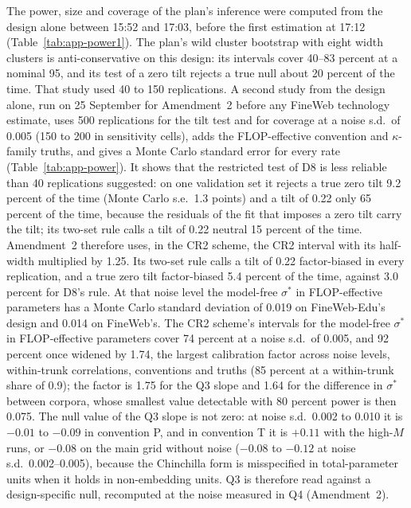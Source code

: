 The power, size and coverage of the plan's inference were computed from the design alone between 15:52 and 17:03, before
the first estimation at 17:12 (Table~\ref{tab:app-power1}). The plan's wild cluster bootstrap with eight width clusters
is anti-conservative on this design: its intervals cover 40--83 percent at a nominal 95, and its test of a zero tilt
rejects a true null about 20 percent of the time. That study used 40 to 150 replications. A second study from the design
alone, run on 25 September for Amendment~2 before any FineWeb technology estimate, uses 500 replications for the tilt test
and for coverage at a noise s.d.\ of 0.005 (150 to 200 in sensitivity cells), adds the FLOP-effective convention and
$\kappa$-family truths, and gives a Monte Carlo standard error for every rate (Table~\ref{tab:app-power}). It shows that
the restricted test of D8 is less reliable than 40 replications suggested: on one validation set it rejects a true zero
tilt 9.2 percent of the time (Monte Carlo s.e.\ 1.3 points) and a tilt of 0.22 only 65 percent of the time, because the
residuals of the fit that imposes a zero tilt carry the tilt; its two-set rule calls a tilt of 0.22 neutral 15 percent
of the time. Amendment~2 therefore uses, in the CR2 scheme, the CR2 interval with its half-width multiplied by 1.25. Its
two-set rule calls a tilt of 0.22 factor-biased in every replication, and a true zero tilt factor-biased 5.4 percent of
the time, against 3.0 percent for D8's rule. At that noise level the model-free $\sigma^*$ in FLOP-effective parameters has a
Monte Carlo standard deviation of 0.019 on FineWeb-Edu's design and 0.014 on FineWeb's. The CR2 scheme's intervals for
the model-free $\sigma^*$ in FLOP-effective parameters cover 74 percent at a noise
s.d.\ of 0.005, and 92 percent once widened by 1.74, the largest calibration factor across noise levels, within-trunk
correlations, conventions and truths (85 percent at a within-trunk share of 0.9); the factor is 1.75 for the Q3 slope and 1.64 for the difference in $\sigma^*$
between corpora, whose smallest value detectable with 80 percent power is then 0.075. The null value of the Q3 slope is
not zero: at noise s.d.\ 0.002 to 0.010 it is $-0.01$ to $-0.09$ in convention P, and in convention T it is $+0.11$ with
the high-$M$ runs, or $-0.08$ on the main grid without noise ($-0.08$ to $-0.12$ at noise s.d.\ 0.002--0.005), because
the Chinchilla form is misspecified in total-parameter units when it holds in non-embedding units. Q3 is therefore read
against a design-specific null, recomputed at the noise measured in Q4 (Amendment~2).

